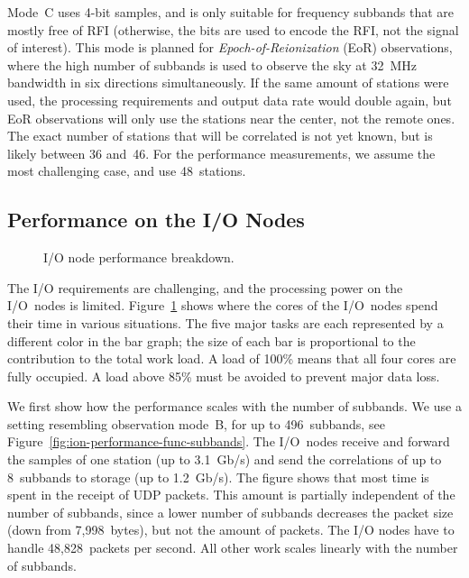\documentclass{sig-alternate}
\begin{document}
Mode~\textsf{C} uses 4-bit samples, and is only suitable for frequency
subbands that are mostly free of RFI (otherwise, the bits are used to encode
the RFI, not the signal of interest).
This mode is planned for \emph{Epoch-of-Reionization} (EoR) observations, where the
high number of subbands is used to observe the sky at 32~MHz bandwidth in six
directions simultaneously.
If the same amount of stations were used, the processing requirements and
output data rate would double again, but EoR observations will only use the
stations near the center, not the remote ones.
The exact number of stations that will be correlated is not yet known, but is
likely between 36 and~46.
For the performance measurements, we assume the most challenging
case, and use 48~stations.


\subsection{Performance on the I/O Nodes}
\label{sec:ION-performance}

\begin{figure}[ht]
\hfill
{}
\caption{I/O node performance breakdown.}
\label{fig:ion-performance}
\end{figure}

The I/O requirements are challenging, and the processing power on the I/O~nodes
is limited.
Figure~\ref{fig:ion-performance} shows where the cores of the
I/O~nodes spend their time in various situations.
The five major tasks are each represented by a different color in the bar
graph; the size of each bar is proportional to the contribution to the total
work load.
A load of 100\% means that all four cores are fully occupied.
A load above 85\% must be avoided to prevent major data loss.

We first show how the performance scales with the number of subbands.
We use a setting resembling observation mode~\textsf{B}, for up
to 496~subbands, see Figure~\ref{fig:ion-performance-func-subbands}.
The I/O~nodes receive and forward the samples
of one station (up to 3.1~Gb/s) and send the correlations of up to 8~subbands
to storage (up to 1.2~Gb/s).
The figure shows that most time is spent in the receipt of UDP packets.
This amount is partially independent of the number of subbands, since a lower
number of subbands decreases the packet size (down from 7,998~bytes), but not
the amount of packets.
The I/O nodes have to handle 48,828~packets per second.
All other work scales linearly with the number of subbands.
\end{document}
